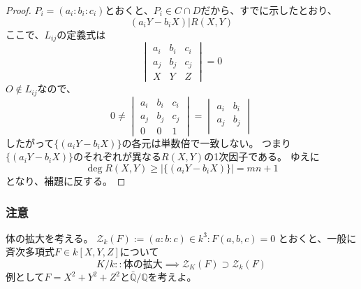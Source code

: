 \documentclass[a4]{article}
\begin{document}
\begin{proof}
            $P_i=(a_i:b_i:c_i)$とおくと、$P_i \in C \cap D$だから、すでに示したとおり、
            \[ (a_i Y - b_i X) | R(X,Y) \]
            ここで、$L_{ij}$の定義式は
            \[
                \begin{vmatrix}
                    a_i& b_i& c_i \\
                    a_j& b_j& c_j \\
                    X  & Y  & Z
                \end{vmatrix}
                =0
            \]
            $O \not \in L_{ij}$なので、
            \[
                0 \neq
                \begin{vmatrix}
                    a_i& b_i& c_i \\
                    a_j& b_j& c_j \\
                    0  & 0  & 1
                \end{vmatrix}
                =
                \begin{vmatrix}
                    a_i& b_i \\
                    a_j& b_j \\
                \end{vmatrix}
            \]
            したがって$\{ (a_i Y - b_i X) \}$の各元は単数倍で一致しない。
            つまり$\{ (a_i Y - b_i X) \}$のそれぞれが異なる$R(X,Y)$の1次因子である。
            ゆえに
            \[ \deg R(X,Y) \geq |\{ (a_i Y - b_i X) \}| = mn+1\]
            となり、補題に反する。
            
        \end{proof}

        \subsubsection{注意}
            体の拡大を考える。
            $\mathcal{Z}_{k}(F):={(a:b:c) \in k^3 : F(a,b,c)=0}$
            とおくと、一般に斉次多項式$F \in k[X,Y,Z]$について
            \[ K/k::\mbox{体の拡大} \implies \mathcal{Z}_K(F) \supset \mathcal{Z}_k(F) \]
            例として$F=X^2+Y^2+Z^2$と$\bar{\mathbb{Q}}/\mathbb{Q}$を考えよ。
\end{document}
